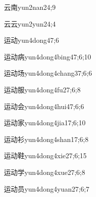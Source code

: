 \begin{verbete}{云南}{yun2nan2}{4;9}
\end{verbete}

\begin{verbete}{云云}{yun2yun2}{4;4}
\end{verbete}

\begin{verbete}{运动}{yun4dong4}{7;6}
\end{verbete}

\begin{verbete}{运动病}{yun4dong4bing4}{7;6;10}
\end{verbete}

\begin{verbete}{运动场}{yun4dong4chang3}{7;6;6}
\end{verbete}

\begin{verbete}{运动服}{yun4dong4fu2}{7;6;8}
\end{verbete}

\begin{verbete}{运动会}{yun4dong4hui4}{7;6;6}
\end{verbete}

\begin{verbete}{运动家}{yun4dong4jia1}{7;6;10}
\end{verbete}

\begin{verbete}{运动衫}{yun4dong4shan1}{7;6;8}
\end{verbete}

\begin{verbete}{运动鞋}{yun4dong4xie2}{7;6;15}
\end{verbete}

\begin{verbete}{运动学}{yun4dong4xue2}{7;6;8}
\end{verbete}

\begin{verbete}{运动员}{yun4dong4yuan2}{7;6;7}
\end{verbete}

